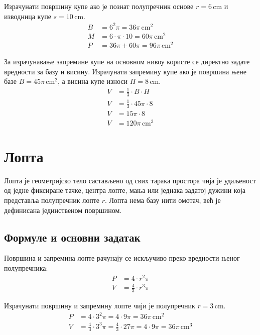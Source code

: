\documentclass[12pt,a5paper]{article}
\begin{document}

Израчунати површину купе ако је познат полупречник основе $r = 6\,\mathrm{cm}$ и изводница купе $s = 10\,\mathrm{cm}$.
\begin{align*}
B &= 6^2 \pi = 36\pi\,\mathrm{cm}^2 \\
M &= 6 \cdot \pi \cdot 10 = 60\pi\,\mathrm{cm}^2 \\
P &= 36\pi + 60\pi = 96\pi\,\mathrm{cm}^2
\end{align*}

За израчунавање запремине купе на основном нивоу користе се директно задате вредности за базу и висину. Израчунати запремину купе ако је површина њене базе $B = 45\pi\,\mathrm{cm}^2$, а висина купе износи $H = 8\,\mathrm{cm}$.
\begin{align*}
V &= \frac{1}{3} \cdot B \cdot H \\
V &= \frac{1}{3} \cdot 45\pi \cdot 8 \\
V &= 15\pi \cdot 8 \\
V &= 120\pi\,\mathrm{cm}^3
\end{align*}

\section{Лопта}

Лопта је геометријско тело састављено од свих тарака простора чија је удаљеност од једне фиксиране тачке, центра лопте, мања или једнака задатој дужини која представља полупречник лопте $r$. Лопта нема базу нити омотач, већ је дефинисана јединственом површином.

\subsection{Формуле и основни задатак}
Површина и запремина лопте рачунају се искључиво преко вредности њеног полупречника:
\begin{align*}
P &= 4 \cdot r^2 \pi \\
V &= \frac{4}{3} \cdot r^3 \pi
\end{align*}

Израчунати површину и запремину лопте чији је полупречник $r = 3\,\mathrm{cm}$.
\begin{align*}
P &= 4 \cdot 3^2 \pi = 4 \cdot 9 \pi = 36\pi\,\mathrm{cm}^2 \\
V &= \frac{4}{3} \cdot 3^3 \pi = \frac{4}{3} \cdot 27 \pi = 4 \cdot 9 \pi = 36\pi\,\mathrm{cm}^3
\end{align*}
\end{document}
